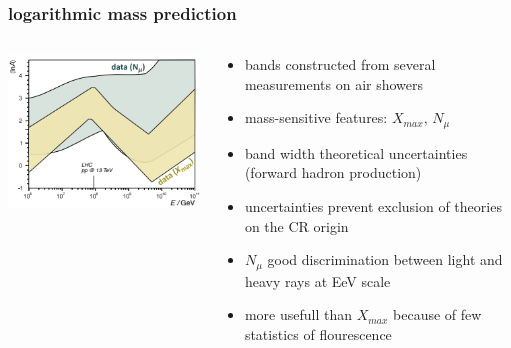 \documentclass[aspectratio=1610, 9pt]{beamer}
\begin{document}
\begin{frame}\frametitle{logarithmic mass prediction}
  \begin{columns}
    \begin{column}[c]{0.48\textwidth}
      \includegraphics{plots/lnA_right.png}
    \end{column}
    \begin{column}[c]{0.48\textwidth}
      \begin{itemize}
        \item bands constructed from several measurements on air showers
        \item mass-sensitive features: $X_{max}$, $N_{\mu}$
        \item band width \to theoretical uncertainties (forward hadron production)
        \item uncertainties prevent exclusion of theories on the CR origin
        \item $N_{\mu}$ good discrimination between light and heavy rays at EeV scale
        \item more usefull than $X_{max}$ because of few statistics of flourescence
      \end{itemize}
    \end{column}
  \end{columns}
\end{frame}
\end{document}
